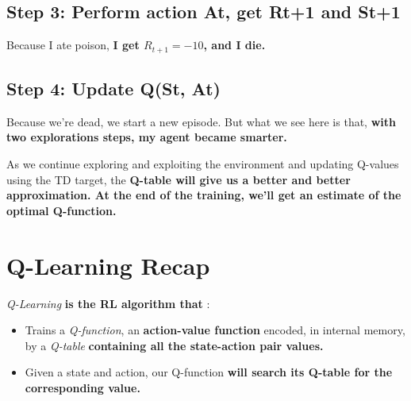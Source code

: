 \documentclass[11pt,a4paper]{article}
\begin{document}

\subsection{Step 3: Perform action At, get Rt+1 and St+1}\label{step-3-perform-action-at-get-rt1-and-st1-1}

Because I ate poison, \textbf{I get \(R_{t+1} = -10\), and I die.}


\subsection{Step 4: Update Q(St, At)}\label{step-4-update-qst-at-2}


Because we're dead, we start a new episode. But what we see here is that, \textbf{with two explorations steps, my agent became smarter.}

As we continue exploring and exploiting the environment and updating Q-values using the TD target, the \textbf{Q-table will give us a better and better approximation. At the end of the training, we'll get an estimate of the optimal Q-function.}

\section{Q-Learning Recap}\label{q-learning-recap}

\emph{Q-Learning} \textbf{is the RL algorithm that} :

\begin{itemize}
\item
  Trains a \emph{Q-function}, an \textbf{action-value function} encoded, in internal memory, by a \emph{Q-table} \textbf{containing all the state-action pair values.}
\item
  Given a state and action, our Q-function \textbf{will search its Q-table for the corresponding value.}
\end{itemize}
\end{document}
